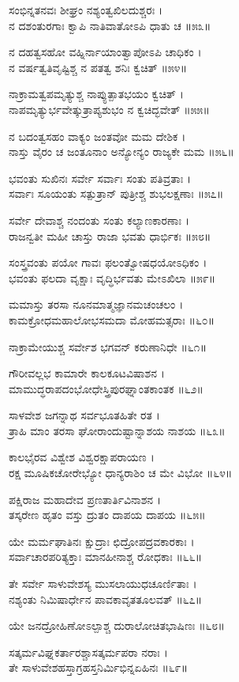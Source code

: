 ಸಂಭಿನ್ನತನವಃ ಶೀಘ್ರಂ ನಶ್ಯಂತ್ವಖಿಲದುಶ್ಚರಃ ।\\
ನ ದಶಂತುರಗಾಃ ಕ್ವಾಪಿ ನಾತಿವಾತೋಽಪಿ ಧಾತು ಚ ॥೫೩॥

ನ ದಹತ್ವಸಹೋ ವಹ್ನಿರ್ನಾಯಾಂತ್ವಾಪೋಽಪಿ ಚಾಧಿಕಂ ।\\
ನ ವರ್ಷತ್ವತಿವೃಷ್ಟಿಶ್ಚ ನ ಪತತ್ವ ಶನಿಃ ಕ್ವಚಿತ್ ॥೫೪॥

ನಾಕ್ರಾಮತ್ವಪಮೃತ್ಯುಶ್ಚ ನಾಪ್ಯುತ್ಪಾತಭಯಂ ಕ್ವಚಿತ್ ।\\
ನಾಪಮೃತ್ಯುರ್ಭವೇತ್ಕುತ್ರಾಪ್ಯಶುಭಂ ನ ಕ್ವಚಿದ್ಭವೇತ್ ॥೫೫॥

ನ ಬದಂತ್ವಸಹಂ ವಾಕ್ಯಂ ಜಂತವೋ ಮಮ ದೇಶಿಕ ।\\
ನಾಸ್ತು ವೈರಂ ಚ ಜಂತೂನಾಂ ಅನ್ಯೋನ್ಯಂ ರಾಜ್ಯಕೇ ಮಮ ॥೫೬॥

ಭವಂತು ಸುಖಿನಃ ಸರ್ವೇ ಸರ್ವಾಃ ಸಂತು ಪತಿವ್ರತಾಃ ।\\
ಸರ್ವಾಃ ಸೂಯಂತು ಸತ್ಪುತ್ರಾನ್ ಪುತ್ರೀಶ್ಚ ಶುಭಲಕ್ಷಣಾಃ ॥೫೭॥

ಸರ್ವೇ ದೇವಾಶ್ಚ ನಂದಂತು ಸಂತು ಕಲ್ಯಾಣಕಾರಣಾಃ ।\\
ರಾಜನ್ವತೀ ಮಹೀ ಚಾಸ್ತು ರಾಜಾ ಭವತು ಧಾರ್ಭಿಕಃ ॥೫೮॥

ಸಂಸ್ತ್ರವಂತು ಪಯೋ ಗಾವಃ ಫಲಂತ್ವೋಷಧಯೋಽಧಿಕಂ ।\\
ಭವಂತು ಫಲದಾ ವೃಕ್ಷಾಃ ವೃದ್ಧಿರ್ಭವತು ಮೇಽಖಿಲಾ ॥೫೯॥

ಮಮಾಸ್ತು ತರಸಾ ನೂನಮಾತ್ಮಜ್ಞಾನಮಚಂಚಲಂ ।\\
ಕಾಮಕ್ರೋಧಮಹಾಲೋಭಸಮದಾ ಮೋಹಮತ್ಸರಾಃ ॥೬೦॥

ನಾಕ್ರಾಮೇಯುಶ್ಚ ಸರ್ವೇಶ ಭಗವನ್ ಕರುಣಾನಿಧೇ ॥೬೧॥

ಗೌರೀವಲ್ಲಭ ಕಾಮಾರೇ ಕಾಲಕೂಟವಿಷಾಶನ ।\\
ಮಾಮುದ್ಧರಾಪದಂಭೋಧೇಸ್ತ್ರಿಪುರಘ್ನಾಂತಕಾಂತಕ ॥೬೨॥

ಸಾಳವೇಶ ಜಗನ್ನಾಥ ಸರ್ವಭೂತಹಿತೇ ರತ ।\\
ತ್ರಾಹಿ ಮಾಂ ತರಸಾ ಘೋರಾಂದುಷ್ಟಾನ್ನಾಶಯ ನಾಶಯ ॥೬೩॥

ಕಾಲಭೈರವ ವಿಶ್ವೇಶ ವಿಶ್ವರಕ್ಷಾಪರಾಯಣ ।\\
ರಕ್ಷ ಮೂಷಿಕಚೋರೇಭ್ಯೋ ಧಾನ್ಯರಾಶಿಂ ಚ ಮೇ ವಿಭೋ ॥೬೪॥

ಪಕ್ಷಿರಾಜ ಮಹಾದೇವ ಪ್ರಣತಾರ್ತಿವಿನಾಶನ ।\\
ತಸ್ಕರೇಣ ಹೃತಂ ವಸ್ತು ದ್ರುತಂ ದಾಪಯ ದಾಪಯ ॥೬೫॥

ಯೇ ಮರ್ಮಘಾತಿನಃ ಕ್ಷುದ್ರಾಃ ಛಿದ್ರೋಪದ್ರವಕಾರಕಾಃ ।\\
ಸರ್ವಾಚಾರಪರಿತ್ಯಕ್ತಾಃ ಮಾನಹೀನಾಶ್ಚ ರೋಧಕಾಃ ॥೬೬॥

ತೇ ಸರ್ವೇ ಸಾಳುವೇಶಸ್ಯ ಮುಸಲಾಯುಧಚೂರ್ಣಿತಾಃ ।\\
ನಶ್ಯಂತು ನಿಮಿಷಾರ್ಧೇನ ಪಾವಕಾವೃತತೂಲವತ್ ॥೬೭॥

ಯೇ ಜನದ್ರೋಹಿಣೋಽಲ್ಪಾಶ್ಚ ದುರಾಲೋಚಿತಭಾಷಿಣಃ ॥೬೮॥

ಸತ್ಕರ್ಮವಿಘ್ನಕರ್ತಾರಶ್ಚಾಸತ್ಕರ್ಮಪರಾ ನರಾಃ ।\\
ತೇ ಸಾಳುವೇಶಹಸ್ತಾಗ್ರಹಸ್ತನಿರ್ಮಿಭಿನ್ನಏಹಿನಃ ॥೬೯॥

